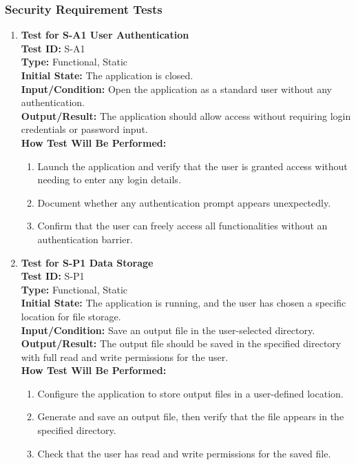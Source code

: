 \documentclass[12pt, titlepage]{article}
\begin{document}
\subsubsection{Security Requirement Tests}
\begin{enumerate}
    \item \textbf{Test for S-A1 User Authentication} \\
      \newline
      \textbf{Test ID:} S-A1 \\
      \textbf{Type:} Functional, Static \\
      \textbf{Initial State:} The application is closed. \\
      \textbf{Input/Condition:} Open the application as a standard user without any authentication. \\
      \textbf{Output/Result:} The application should allow access without requiring login credentials or password input. \\
      \textbf{How Test Will Be Performed:}
      \begin{enumerate}
          \item Launch the application and verify that the user is granted access without needing to enter any login details.
          \item Document whether any authentication prompt appears unexpectedly.
          \item Confirm that the user can freely access all functionalities without an authentication barrier.
      \end{enumerate}

    \item \textbf{Test for S-P1 Data Storage} \\
      \newline
      \textbf{Test ID:} S-P1 \\
      \textbf{Type:} Functional, Static \\
      \textbf{Initial State:} The application is running, and the user has chosen a specific location for file storage. \\
      \textbf{Input/Condition:} Save an output file in the user-selected directory. \\
      \textbf{Output/Result:} The output file should be saved in the specified directory with full read and write permissions for the user. \\
      \textbf{How Test Will Be Performed:}
      \begin{enumerate}
          \item Configure the application to store output files in a user-defined location.
          \item Generate and save an output file, then verify that the file appears in the specified directory.
          \item Check that the user has read and write permissions for the saved file.
      \end{enumerate}


\end{enumerate}
\end{document}
